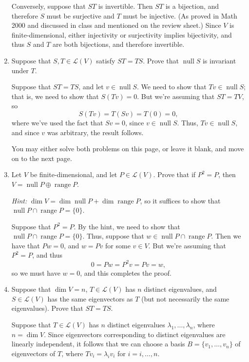 \documentclass[12pt]{article}
\newcommand{\points}[1]{\marginpar{\hspace{24pt}[#1]}}
\DeclareMathOperator{\nul}{null}
\DeclareMathOperator{\range}{range}
\begin{document}
\begin{enumerate}
Conversely, suppose that $ST$ is invertible. Then $ST$ is a bijection, and therefore $S$ must be surjective and $T$ must be injective. (As proved in Math 2000 and discussed in class and mentioned on the review sheet.) Since $V$ is finite-dimensional, either injectivity or surjectivity implies bijectivity, and thus $S$ and $T$ are both bijections, and therefore invertible.

\bigskip

\item Suppose that $S,T\in \mathcal{L}(V)$ satisfy $ST=TS$. Prove that $\operatorname{null}S$ is invariant under $T$. \points{6}

\bigskip

Suppose that $ST=TS$, and let $v\in \nul S$. We need to show that $Tv\in\nul S$; that is, we need to show that $S(Tv) = 0$. But we're assuming that $ST=TV$, so
\[
 S(Tv) = T(Sv) = T(0)=0,
\]
where we've used the fact that $Sv=0$, since $v\in \nul S$. Thus, $Tv\in \nul S$, and since $v$ was arbitrary, the result follows.

\newpage

You may either solve both problems on this page, or leave it blank, and move on to the next page.

\item Let $V$ be finite-dimensional, and let $P\in\mathcal{L}(V)$. Prove that if $P^2=P$, then\\ $V=\nul P\oplus\range P$.\points{6}

{\em Hint:} $\dim V = \dim \nul P+\dim \range P$, so it suffices to show that $\nul P\cap \range P=\{0\}$.

\bigskip

Suppose that $P^2=P$. By the hint, we need to show that $\nul P\cap \range P=\{0\}$. Thus, suppose that $w\in\nul P\cap\range P$. Then we have that $Pw=0$, and $w=Pv$ for some $v\in V$. But we're assuming that $P^2=P$, and thus
\[
 0 = Pw = P^2v = Pv = w,
\]
so we must have $w=0$, and this completes the proof.

\bigskip

\item Suppose that $\dim V = n$, $T\in\mathcal{L}(V)$ has $n$ distinct eigenvalues, and $S\in\mathcal{L}(V)$ has the same eigenvectors as $T$ (but not necessarily the same eigenvalues). Prove that $ST=TS$. \points{6}

\bigskip

Suppose that $T\in\mathcal{L}(V)$ has $n$ distinct eigenvalues $\lambda_1,\ldots, \lambda_n$, where $n=\dim V$. Since eigenvectors corresponding to distinct eigenvalues are linearly independent, it follows that we can choose a basis $B=\{v_1,\ldots, v_n\}$ of eigenvectors of $T$, where $Tv_i=\lambda_iv_i$ for $i=i,\ldots, n$.


\end{enumerate}
\end{document}
